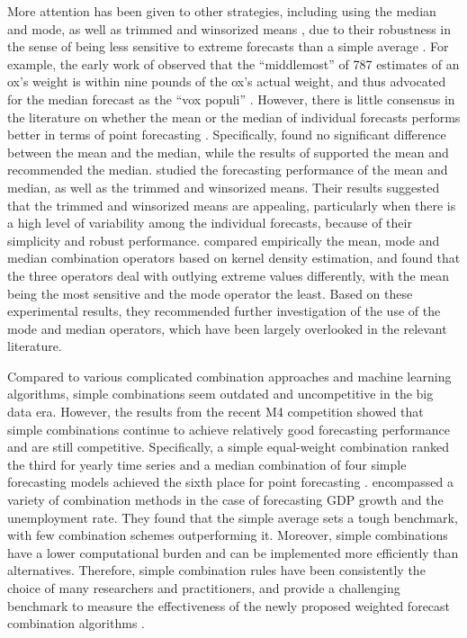 \documentclass[a4paper,11pt]{article}
\begin{document}
More attention has been given to other strategies, including using the median and mode, as well as trimmed and winsorized means \citep[e.g.,][]{Chan1999-io,Stock2004-rq,Genre2013-ut,Jose2014-uh,Grushka-Cockayne2017-dj}, due to their robustness in the sense of being less sensitive to extreme forecasts than a simple average \citep{Lichtendahl2020-ut}. For example, the early work of \citet{Galton1907-vox} observed that the ``middlemost'' of 787 estimates of an ox's weight is within nine pounds of the ox's actual weight, and thus advocated for the median forecast as the ``vox populi'' \citep{Galton1907-one}. However, there is little consensus in the literature on whether the mean or the median of individual forecasts performs better in terms of point forecasting \citep{Kolassa2011-ai}. Specifically, \citet{McNees1992-qc} found no significant difference between the mean and the median, while the results of \citet{Stock2004-rq} supported the mean and \citet{Agnew1985-dj,Galton1907-vox} recommended the median. \citet{Jose2008-vm} studied the forecasting performance of the mean and median, as well as the trimmed and winsorized means. Their results suggested that the trimmed and winsorized means are appealing, particularly when there is a high level of variability among the individual forecasts, because of their simplicity and robust performance. \citet{Kourentzes2014-hs} compared empirically the mean, mode and median combination operators based on kernel density estimation, and found that the three operators deal with outlying extreme values differently, with the mean being the most sensitive and the mode operator the least. Based on these experimental results, they recommended further investigation of the use of the mode and median operators, which have been largely overlooked in the relevant literature.

Compared to various complicated combination approaches and machine learning algorithms, simple combinations seem outdated and uncompetitive in the big data era. However, the results from the recent M4 competition \citep{Makridakis2020-hu} showed that simple combinations continue to achieve relatively good forecasting performance and are still competitive. Specifically, a simple equal-weight combination ranked the third for yearly time series \citep{Shaub2019-on} and a median combination of four simple forecasting models achieved the sixth place for point forecasting \citep{Petropoulos2020-fp}. \citet{Genre2013-ut} encompassed a variety of combination methods in the case of forecasting GDP growth and the unemployment rate. They found that the simple average sets a tough benchmark, with few combination schemes outperforming it. Moreover, simple combinations have a lower computational burden and can be implemented more efficiently than alternatives. Therefore, simple combination rules have been consistently the choice of many researchers and practitioners, and provide a challenging benchmark to measure the effectiveness of the newly proposed weighted forecast combination algorithms \citep[e.g.,][]{Makridakis2000-he,Stock2004-rq,Makridakis2020-hu,Montero-Manso2020-tq,Kang2020-rl,Wang2021-un}.
\end{document}
